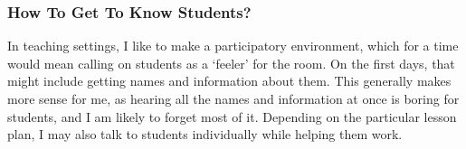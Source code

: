 \documentclass{notes}
\begin{document}
\subsubsection*{How To Get To Know Students?}
\tab In teaching settings, I like to make a participatory environment, which for a time would mean calling on students as a `feeler' for the room. On the first days, that might include getting names and information about them. This generally makes more sense for me, as hearing all the names and information at once is boring for students, and I am likely to forget most of it. Depending on the particular lesson plan, I may also talk to students individually while helping them work.
\end{document}
